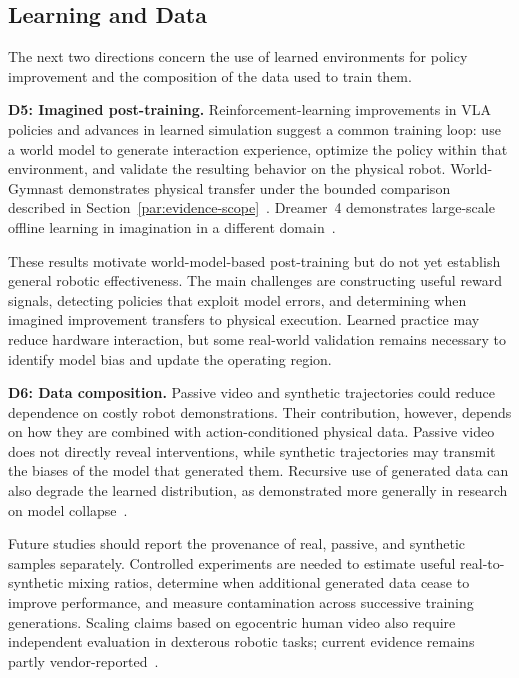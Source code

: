 \documentclass{ieeeaccess}
\begin{document}
\subsection{Learning and Data}

The next two directions concern the use of learned environments for policy improvement and the composition of the data used to train them.

\noindent\textbf{D5: Imagined post-training.}
Reinforcement-learning improvements in VLA policies and advances in learned simulation suggest a common training loop: use a world model to generate interaction experience, optimize the policy within that environment, and validate the resulting behavior on the physical robot. \textcolor[RGB]{104,48,148}{World-Gymnast demonstrates physical transfer under the bounded comparison described in Section~\ref{par:evidence-scope}~\cite{sharma2026worldgymnast}.} Dreamer~4 demonstrates large-scale offline learning in imagination in a different domain~\cite{dreamer4}.

These results motivate world-model-based post-training but do not yet establish general robotic effectiveness. The main challenges are constructing useful reward signals, detecting policies that exploit model errors, and determining when imagined improvement transfers to physical execution. Learned practice may reduce hardware interaction, but some real-world validation remains necessary to identify model bias and update the operating region.

\noindent\textbf{D6: Data composition.}
Passive video and synthetic trajectories could reduce dependence on costly robot demonstrations. Their contribution, however, depends on how they are combined with action-conditioned physical data. Passive video does not directly reveal interventions, while synthetic trajectories may transmit the biases of the model that generated them. Recursive use of generated data can also degrade the learned distribution, as demonstrated more generally in research on model collapse~\cite{modelcollapse}.

Future studies should report the provenance of real, passive, and synthetic samples separately. Controlled experiments are needed to estimate useful real-to-synthetic mixing ratios, determine when additional generated data cease to improve performance, and measure contamination across successive training generations. Scaling claims based on egocentric human video also require independent evaluation in dexterous robotic tasks; current evidence remains partly vendor-reported~\cite{grootn15}.
\end{document}
